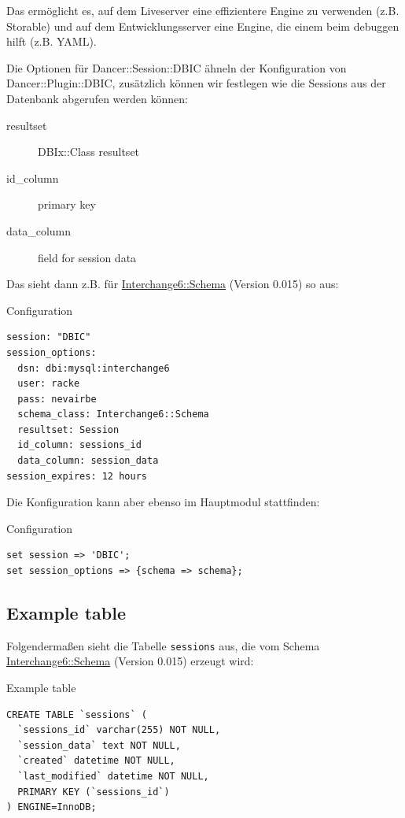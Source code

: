 Das ermöglicht es, auf dem Liveserver eine effizientere Engine
zu verwenden (z.B. Storable) und auf dem Entwicklungsserver
eine Engine, die einem beim debuggen hilft (z.B. YAML).

Die Optionen für Dancer::Session::DBIC ähneln der Konfiguration von
Dancer::Plugin::DBIC, zusätzlich können wir festlegen wie
die Sessions aus der Datenbank abgerufen werden können:

\begin{description}
\item[resultset] DBIx::Class resultset
\item[id\_column] primary key
\item[data\_column] field for session data 
\end{description}

Das sieht dann z.B. für \href{https://metacpan.org/pod/Interchange6::Schema}{Interchange6::Schema} (Version 0.015) so aus:

\begin{frame}[fragile]{Configuration}
\begin{lstlisting}
session: "DBIC"
session_options:
  dsn: dbi:mysql:interchange6
  user: racke
  pass: nevairbe
  schema_class: Interchange6::Schema
  resultset: Session
  id_column: sessions_id
  data_column: session_data
session_expires: 12 hours
\end{lstlisting}
\end{frame}

Die Konfiguration kann aber ebenso im Hauptmodul
stattfinden:

\begin{frame}[fragile]{Configuration}
\begin{lstlisting}
set session => 'DBIC';
set session_options => {schema => schema};
\end{lstlisting}
\end{frame}

\subsection{Example table}

Folgendermaßen sieht die Tabelle \verb|sessions| aus,
die vom Schema \href{https://metacpan.org/pod/Interchange6::Schema}{Interchange6::Schema} (Version 0.015)
erzeugt wird:

\begin{frame}[fragile]{Example table}
\begin{lstlisting}
CREATE TABLE `sessions` (
  `sessions_id` varchar(255) NOT NULL,
  `session_data` text NOT NULL,
  `created` datetime NOT NULL,
  `last_modified` datetime NOT NULL,
  PRIMARY KEY (`sessions_id`)
) ENGINE=InnoDB;
\end{lstlisting}
\end{frame}

